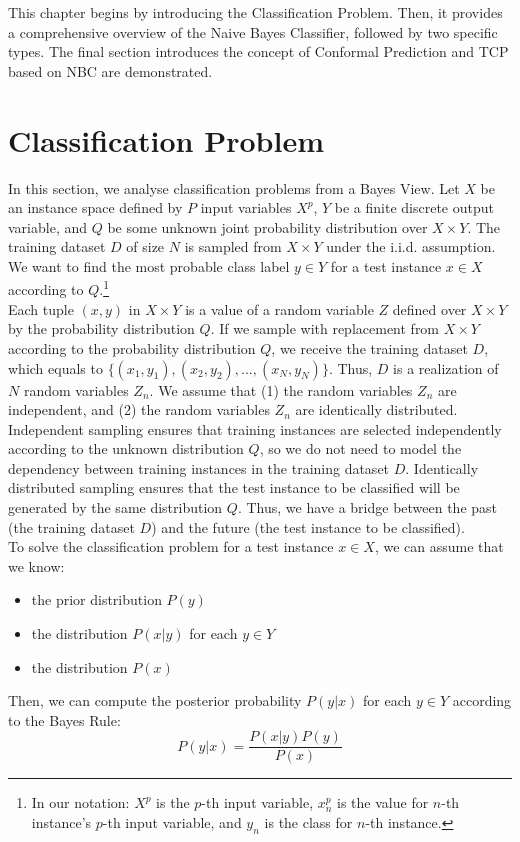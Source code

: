 \documentclass[10pt]{reportMaster}
\begin{document}
This chapter begins by introducing the Classification Problem. Then, it provides a comprehensive overview of the Naive Bayes Classifier, followed by two specific types. The final section introduces the concept of Conformal Prediction and TCP based on NBC are demonstrated.

\section{Classification Problem}

In this section, we analyse classification problems from a Bayes View. Let $X$ be an instance space defined by $P$ input variables $X^p$, $Y$ be a finite discrete output variable, and $Q$ be some unknown joint probability distribution over $X \times Y$. The training dataset $D$ of size $N$ is sampled from $X \times Y$ under the i.i.d. assumption. We want to find the most probable class label $y \in Y$ for a test instance $x \in X$ according to $Q$.\footnote[2]{In our notation: $X^p$ is the $p$-th input variable, $x_n^p$ is the value for $n$-th instance’s $p$-th input variable, and $y_n$ is the class for $n$-th instance.}\\

\noindent Each tuple $(x,y)$ in $X \times Y$ is a value of a random variable $Z$ defined over $X \times Y$ by the probability distribution $Q$. If we sample with replacement from $X \times Y$ according to the probability distribution $Q$, we receive the training dataset $D$, which equals to $\{(x_1, y_1),(x_2,y_2),...,(x_N,y_N)\}$. Thus, $D$ is a realization of $N$ random variables $Z_n$. We assume that (1) the random variables $Z_n$ are independent, and (2) the random variables $Z_n$ are identically distributed. Independent sampling ensures that training instances are selected independently according to the unknown distribution $Q$, so we do not need to model the dependency between training instances in the training dataset $D$. Identically distributed sampling ensures that the test instance to be classified will be generated by the same distribution $Q$. Thus, we have a bridge between the past (the training dataset $D$) and the future (the test instance to be classified).\\

\noindent To solve the classification problem for a test instance $x \in X$, we can assume that we know:
\begin{itemize}
\item the prior distribution $P(y)$
\item the distribution $P(x|y)$ for each $y \in Y$
\item the distribution $P(x)$
\end{itemize}
Then, we can compute the posterior probability $P(y|x)$ for each $y \in Y$ according to the Bayes Rule:
\begin{equation}
    P(y|x) = \frac{P(x|y)P(y)}{P(x)} \tag{1}\label{eq:1}
\end{equation}
\end{document}
